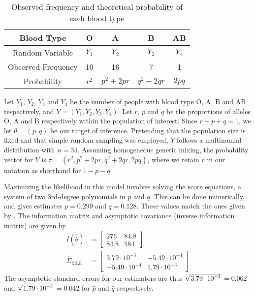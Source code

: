 \documentclass[ss]{imsart}
\theoremstyle{plain}
\theoremstyle{definition}
\theoremstyle{remark}
\begin{document}
\begin{table}
    \centering
    \caption{Observed frequency and theoretical probability of each blood type \citep{Fuj78}}
    \begin{tabular}{c|cccc}
        Blood Type & O & A & B & AB\\
        \hline
        Random Variable & $Y_1$ & $Y_2$ & $Y_3$ & $Y_4$\\
        Observed Frequency & 10 & 16 & 7 & 1\\
        Probability & $r^2$ & $p^2 + 2pr$ & $q^2 + 2qr$ & $2pq$
    \end{tabular}
    \label{tab2:blood_type}
\end{table}

Let $Y_1$, $Y_2$, $Y_3$ and $Y_4$ be the number of people with blood type O, A, B and AB respectively, and $Y = (Y_1, Y_2, Y_3, Y_4)$. Let $r$, $p$ and $q$ be the proportions of alleles O, A and B respectively within the population of interest. Since $r + p + q = 1$, we let $\theta = (p, q)$ be our target of inference. Pretending that the population size is fixed and that simple random sampling was employed, $Y$ follows a multinomial distribution with $n = 34$. Assuming homogeneous genetic mixing, the probability vector for $Y$ is $\pi = (r^2, p^2 + 2pr, q^2 + 2qr, 2pq)$, where we retain $r$ in our notation as shorthand for $1 - p - q$.

Maximizing the likelihood in this model involves solving the score equations, a system of two 3rd-degree polynomials in $p$ and $q$. This can be done numerically, and gives estimates $p = 0.299$ and $q = 0.128$. These values match the ones given by \citet{Fuj78}. The information matrix and asymptotic covariance (inverse information matrix) are given by
%
\begin{align}
    I(\hat{\theta}) &= \begin{bmatrix}
        276 & 84.8\\
        84.8 & 584
    \end{bmatrix}\\
    \hat{\Sigma}_\mathrm{MLE} &= \begin{bmatrix}
        3.79 \cdot 10^{-3} & -5.49 \cdot 10^{-4}\\
        -5.49 \cdot 10^{-4} & 1.79 \cdot 10^{-3}
    \end{bmatrix} \label{eq:obs_lik_SE}
\end{align}
%
The asymptotic standard errors for our estimators are thus $\sqrt{3.79 \cdot 10^{-3}} = 0.062$ and $\sqrt{1.79 \cdot 10^{-3}} = 0.042$ for $\hat{p}$ and $\hat{q}$ respectively.
\end{document}
